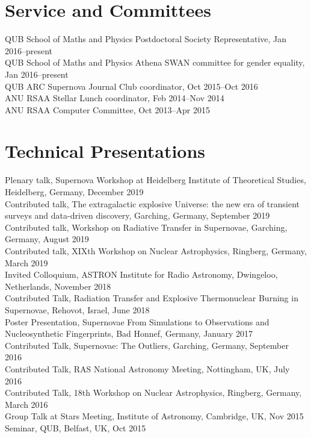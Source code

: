 \documentclass[11pt]{res} %
\begin{document}
\begin{resume}
\section{Service and Committees}
	QUB School of Maths and Physics Postdoctoral Society Representative, Jan 2016--present\\
	QUB School of Maths and Physics Athena SWAN committee for gender equality, Jan 2016--present\\
	QUB ARC Supernova Journal Club coordinator, Oct 2015--Oct 2016\\
	ANU RSAA Stellar Lunch coordinator, Feb 2014--Nov 2014\\
	ANU RSAA Computer Committee, Oct 2013--Apr 2015

\section{Technical Presentations}
  Plenary talk, Supernova Workshop at Heidelberg Institute of Theoretical Studies, Heidelberg, Germany, December 2019\\
  Contributed talk, The extragalactic explosive Universe: the new era of transient surveys and data-driven discovery, Garching, Germany, September 2019\\
  Contributed talk, Workshop on Radiative Transfer in Supernovae, Garching, Germany, August 2019\\
  Contributed talk, XIXth Workshop on Nuclear Astrophysics, Ringberg, Germany, March 2019\\
  Invited Colloquium, ASTRON Institute for Radio Astronomy, Dwingeloo, Netherlands, November 2018\\
  Contributed Talk, Radiation Transfer and Explosive Thermonuclear Burning in Supernovae, Rehovot, Israel, June 2018\\
  Poster Presentation, Supernovae From Simulations to Observations and Nucleosynthetic Fingerprints, Bad Honnef, Germany, January 2017\\
  Contributed Talk, Supernovae: The Outliers, Garching, Germany, September 2016\\
  Contributed Talk, RAS National Astronomy Meeting, Nottingham, UK, July 2016\\
  Contributed Talk, 18th Workshop on Nuclear Astrophysics, Ringberg, Germany, March 2016\\
  Group Talk at Stars Meeting, Institute of Astronomy, Cambridge, UK, Nov 2015\\
  Seminar, QUB, Belfast, UK, Oct 2015\\

\end{resume}
\end{document}
